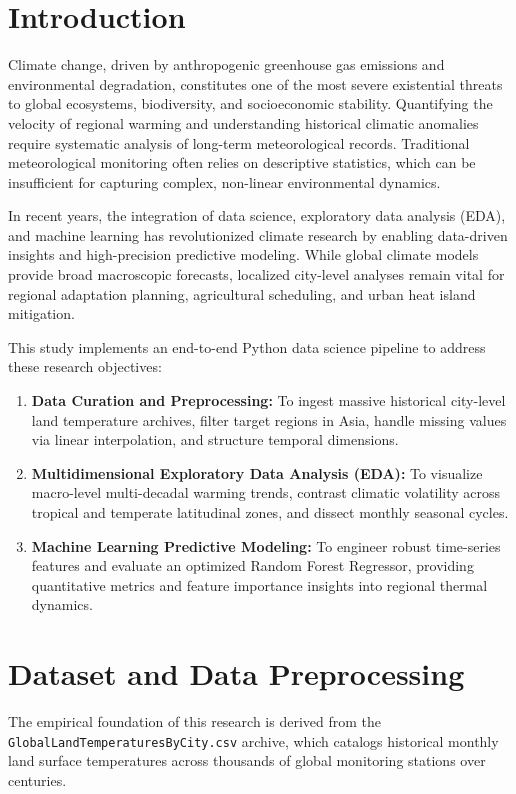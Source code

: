 \documentclass[runningheads]{llncs}
\begin{document}
\section{Introduction}

Climate change, driven by anthropogenic greenhouse gas emissions and environmental degradation, constitutes one of the most severe existential threats to global ecosystems, biodiversity, and socioeconomic stability. Quantifying the velocity of regional warming and understanding historical climatic anomalies require systematic analysis of long-term meteorological records. Traditional meteorological monitoring often relies on descriptive statistics, which can be insufficient for capturing complex, non-linear environmental dynamics. 

In recent years, the integration of data science, exploratory data analysis (EDA), and machine learning has revolutionized climate research by enabling data-driven insights and high-precision predictive modeling. While global climate models provide broad macroscopic forecasts, localized city-level analyses remain vital for regional adaptation planning, agricultural scheduling, and urban heat island mitigation.

This study implements an end-to-end Python data science pipeline to address these research objectives:
\begin{enumerate}
    \item \textbf{Data Curation and Preprocessing:} To ingest massive historical city-level land temperature archives, filter target regions in Asia, handle missing values via linear interpolation, and structure temporal dimensions.
    \item \textbf{Multidimensional Exploratory Data Analysis (EDA):} To visualize macro-level multi-decadal warming trends, contrast climatic volatility across tropical and temperate latitudinal zones, and dissect monthly seasonal cycles.
    \item \textbf{Machine Learning Predictive Modeling:} To engineer robust time-series features and evaluate an optimized Random Forest Regressor, providing quantitative metrics and feature importance insights into regional thermal dynamics.
\end{enumerate}


\section{Dataset and Data Preprocessing}

The empirical foundation of this research is derived from the \texttt{GlobalLandTemperaturesByCity.csv} archive, which catalogs historical monthly land surface temperatures across thousands of global monitoring stations over centuries. 
\end{document}

